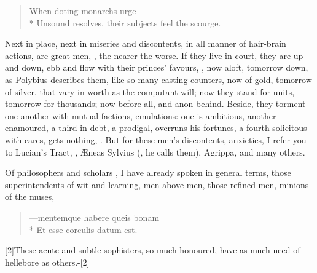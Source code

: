 {\begin{verse}
When doting monarchs urge\\*
Unsound resolves, their subjects feel the scourge.
\end{verse}

Next in place, next in miseries and discontents, in all manner of
hair-brain actions, are great men, , the
nearer the worse. If they live in court, they are up and down, ebb and
flow with their princes' favours, ,
now aloft, tomorrow down, as Polybius describes them, like so many
casting counters, now of gold, tomorrow of silver, that vary in worth
as the computant will; now they stand for units, tomorrow for
thousands; now before all, and anon behind. Beside, they torment one
another with mutual factions, emulations: one is ambitious, another
enamoured, a third in debt, a prodigal, overruns his fortunes, a fourth
solicitous with cares, gets nothing, \etc{}. But for these men's
discontents, anxieties, I refer you to Lucian's Tract, , \AE{}neas Sylvius (, he
calls them), Agrippa, and many others.

Of philosophers and scholars , I have
already spoken in general terms, those superintendents of wit and
learning, men above men, those refined men, minions of the muses,

\begin{verse}
---mentemque habere queis bonam\\*
Et esse corculis datum est.---
\end{verse}

[2\baselineskip]These acute and subtle sophisters, so much honoured, have as much
need of hellebore as others.-[2\baselineskip]

}
